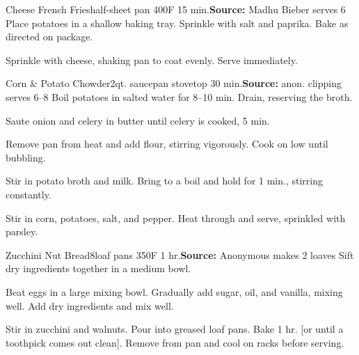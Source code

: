 \begin{recipe}{Cheese French Fries}{half-sheet pan \hfill 400\0F \hfill 15 min.}{\textbf{Source:} Madhu Bieber \hfill serves 6}
 Place potatoes in a shallow baking tray. Sprinkle with salt and paprika. Bake as directed on package.

 Sprinkle with cheese, shaking pan to coat evenly. Serve immediately.
\end{recipe}

\begin{recipe}{Corn \& Potato Chowder}{2qt. saucepan \hfill stovetop \hfill 30 min.}{\textbf{Source:} anon. clipping \hfill serves 6--8}
 Boil potatoes in salted water for 8--10 min. Drain, reserving the broth.

 Saute onion and celery in butter until celery is cooked, 5 min.

 Remove pan from heat and add flour, stirring vigorously. Cook on low until bubbling.

 Stir in potato broth and milk. Bring to a boil and hold for 1 min., stirring constantly.

 Stir in corn, potatoes, salt, and pepper. Heat through and serve, sprinkled with parsley.
\end{recipe}

\begin{recipe}{Zucchini Nut Bread}{8\inch{}\inch loaf pans \hfill 350\0F \hfill 1 hr.}{\textbf{Source:} Anonymous \hfill makes 2 loaves}
 Sift dry ingredients together in a medium bowl.

 Beat eggs in a large mixing bowl. Gradually add sugar, oil, and vanilla, mixing well. Add dry ingredients and mix well.

 Stir in zucchini and walnuts. Pour into greased loaf pans. Bake 1 hr. [or until a toothpick comes out clean]. Remove from pan and cool on racks before serving.
\end{recipe}

